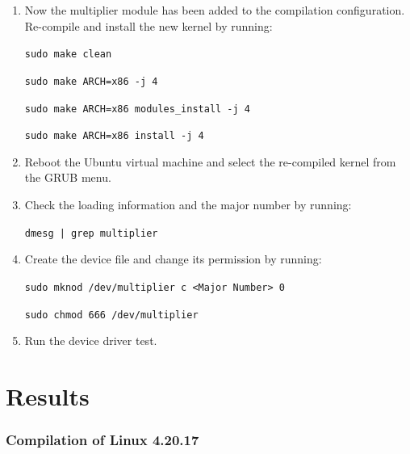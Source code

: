 \documentclass[11pt,letterpaper,titlepage]{article}
\begin{document}
\begin{enumerate}
    \item Now the multiplier module has been added to the compilation configuration. Re-compile and install the new kernel by running:
    
    \texttt{sudo make clean}
    
    \texttt{sudo make ARCH=x86 -j 4}
    
    \texttt{sudo make ARCH=x86 modules\_install -j 4}
    
    \texttt{sudo make ARCH=x86 install -j 4}
    
    \item Reboot the Ubuntu virtual machine and select the re-compiled kernel from the GRUB menu.
    
    \item Check the loading information and the major number by running:
    
    \texttt{dmesg | grep multiplier}
    
    \item Create the device file and change its permission by running:
    
    \texttt{sudo mknod /dev/multiplier c <Major Number> 0}
    
    \texttt{sudo chmod 666 /dev/multiplier}
    
    \item Run the device driver test.
    
\end{enumerate}

\newpage

\part{Results}

\section{Compilation of Linux 4.20.17}
\end{document}
